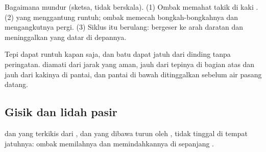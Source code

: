 \begin{omfigure}
{\small Bagaimana   mundur (sketsa, tidak berskala). (1) Ombak
memahat takik di kaki . (2)  yang menggantung runtuh; ombak
memecah bongkah-bongkahnya dan mengangkutnya pergi. (3) Siklus itu
berulang:  bergeser ke arah daratan dan meninggalkan  
yang datar di depannya.}
\label{fig:g9:landforms:cliff-retreat}
\end{omfigure}

\begin{safety}
Tepi  dapat runtuh kapan saja, dan batu dapat jatuh dari dinding
 tanpa peringatan.  diamati dari jarak yang aman, jauh dari
tepinya di bagian atas dan jauh dari kakinya di pantai, dan pantai di
bawah  ditinggalkan sebelum air pasang datang.
\end{safety}

\subsection{Gisik dan lidah pasir}

 dan  yang terkikis dari , dan yang dibawa turun oleh
, tidak tinggal di tempat jatuhnya: ombak memilahnya dan
memindahkannya di sepanjang .

